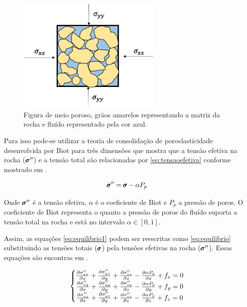 \begin{figure}[!htbp]
\centering
\includegraphics[width=7cm]{chap01/figs/fluido_rocha_tensoes.png}
\caption{Figura de meio poroso, grãos amarelos representando a matriz da rocha e fluído representado pela cor azul.}
\label{fig:rochaComFluido}
\end{figure}

Para isso pode-se utilizar a teoria de consolidação de poroelasticidade desenvolvida por Biot para três dimensões que mostra que a tensão efetiva na rocha ($\pmb{\sigma}^{\prime\prime}$) e a tensão total são relacionadas por \eqref{eq:tensaoefetiva} conforme mostrado em \citet{ResGeomec}.

\begin{equation}
\label{eq:tensaoefetiva}
    \stef = \st - \alpha P_p
\end{equation}

Onde $\pmb{\sigma}^{\prime\prime}$ é a tensão efetiva, $\alpha$ é o coeficiente de Biot e $P_p$ a pressão de poros. O coeficiente de Biot representa o quanto a pressão de poros do fluído suporta a tensão total na rocha e está no intervalo $\alpha \in [0,1]$.

Assim, as equações \eqref{eq:equilibrio1} podem ser reescritas como \eqref{eq:equilibrio} substituindo as tensões totais ($\pmb{\sigma}$) pela tensões efetivas na rocha ($\pmb{\sigma}^{\prime\prime}$). Essas equações são encontras em \cite{CompGeomec}.



\begin{equation}
\label{eq:equilibrio}
\left\{\begin{matrix}
\dx[\sxx]  + \dy[\syx] + \dz[\szx] - \dx[\alpha P_p] + f_x   = 0
\\
\dx[\sxy]  + \dy[\syy] + \dz[\szy] - \dy[\alpha P_p]  + f_y   = 0
\\
\dx[\sxz]  + \dy[\syz] + \dz[\szz] - \dz[\alpha P_p] + f_z   = 0
\end{matrix}\right.
\end{equation}

